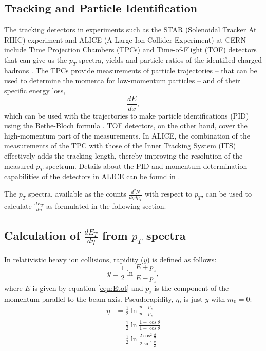 \subsection{Tracking and Particle Identification}
The tracking detectors in experiments such as the STAR (Solenoidal Tracker At RHIC) experiment and ALICE (A Large Ion Collider Experiment) at CERN include Time Projection Chambers (TPCs) and Time-of-Flight (TOF) detectors that can give us the $p_{T}$ spectra, yields and particle ratios of the identified charged hadrons \cite{Preghenella:2011vy, PhysRevC.96.044904}. The TPCs provide measurements of particle trajectories -- that can be used to determine the momenta for low-momentum particles -- and of their specific energy loss, 
\begin{equation}\label{eqn:specificEnLoss}
	\frac{dE}{dx} ,
\end{equation}
which can be used with the trajectories to make particle identifications (PID) using the Bethe-Bloch formula \cite{bethe1953passage}. TOF detectors, on the other hand, cover the high-momentum part of the measurements. In ALICE, the combination of the measurements of the TPC with those of the Inner Tracking System (ITS) effectively adds the tracking length, thereby improving the resolution of the measured $p_{T}$ spectrum. Details about the PID and momentum determination capabilities of the detectors in ALICE can be found in \cite{1748-0221-3-08-S08002}.

The $p_{T}$ spectra, available as the counts $\frac{d^{2}N}{dydp_{T}}$ with respect to $p_{T}$, can be used to calculate $\frac{dE_{T}}{d\eta}$ as formulated in the following section.

\subsection{Calculation of $\frac{dE_{T}}{d\eta}$ from $p_{T}$ spectra}\label{section:calcFromSpectra}
In relativistic heavy ion collisions, rapidity ($y$) is defined as follows:
\begin{equation}\label{eqn:rapidity}
y\equiv\frac{1}{2}\ln{\frac{E + p_{z}}{E - p_{z}}},
\end{equation}
where $E$ is given by equation \ref{eqn:Etot} and $p_{z}$ is the component of the momentum parallel to the beam axis.
Pseudorapidity, $\eta$, is just $y$ with $m_{0} = 0$:
\begin{align*}\label{derivation:pseudorapidity}
\eta &= \frac{1}{2}\ln{\frac{p + p_{z}}{p - p_{z}}}\\
&= \frac{1}{2}\ln{\frac{1 + \cos{\theta}}{1 - \cos{\theta}}}\\
&= \frac{1}{2}\ln{\frac{2\cos^2{\frac{\theta}{2}}}{2\sin^2{\frac{\theta}{2}}}}
\end{align*}

